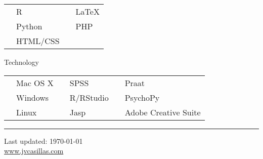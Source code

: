 \documentclass[11pt,letterpaper]{assets/tex/moderncv}
\begin{document}
\begin{tabular}{p{1.15in}lp{.6in}l}
  & R        & & \LaTeX \\
  & Python   & & PHP    \\
  & HTML/CSS & &        \\ [2.5ex]
\end{tabular}

\vspace{.2in}

Technology \vspace{-.18in}

\begin{tabular}{p{1.15in}lp{.7in}lp{.7in}l}
   & Mac OS X             & & SPSS      & & Praat                \\ 
   & Windows              & & R/RStudio & & PsychoPy             \\ 
   & Linux                & & Jasp      & & Adobe Creative Suite \\ [2.5ex]
\end{tabular}

\noindent 

\rule{492pt}{1.5pt}

\smallskip

\begin{center}
  \begin{footnotesize}
    Last updated: \today \\
    \href{http://www.jvcasillas.com}{www.jvcasillas.com}
  \end{footnotesize}
\end{center}


\end{document}

